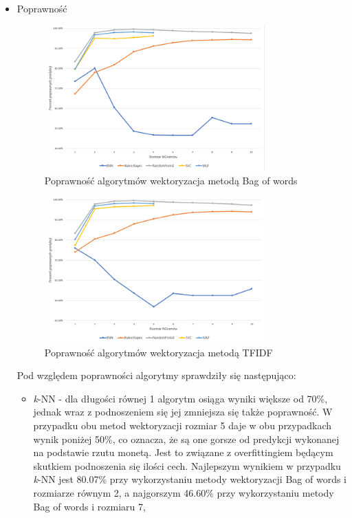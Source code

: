 \begin{itemize}
    \item Poprawność
    \begin{figure}[h!]
        \centering
        \includegraphics[width=0.8\textwidth]{./Img/BOWAcc.png}
        \caption{Poprawność algorytmów wektoryzacja metodą Bag of words}
    \end{figure}
    
    \begin{figure}[h!]
        \centering
        \includegraphics[width=0.8\textwidth]{./Img/TFIDFAcc.png}
        \caption{Poprawność algorytmów wektoryzacja metodą TFIDF}
    \end{figure}
    
    Pod względem poprawności algorytmy sprawdziły się następująco:
    \begin{itemize}
        \item \textit{k}-NN -
        dla długości równej 1 algorytm osiąga wyniki większe od 70\%, jednak wraz 
        z podnoszeniem się jej zmniejsza się także poprawność. W przypadku obu metod 
        wektoryzacji rozmiar 5 daje w obu przypadkach wynik poniżej 50\%, co oznacza, że są one gorsze 
        od predykcji wykonanej na podstawie rzutu monetą. Jest to związane 
        z overfittingiem będącym skutkiem podnoszenia się ilości cech. Najlepszym wynikiem w 
        przypadku \textit{k}-NN jest 80.07\% przy wykorzystaniu metody wektoryzacji Bag of words i rozmiarze równym 2,
        a najgorszym 46.60\%  przy wykorzystaniu metody Bag of words i rozmiaru 7,


\end{itemize}
\end{itemize}
